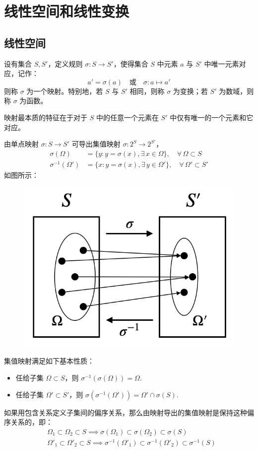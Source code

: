 \section{线性空间和线性变换}

\subsection{线性空间}

\begin{definition}[映射，变换，函数]
设有集合 $S,S'$，定义规则 $\sigma:S\to S'$，使得集合 $S$ 中元素 $a$ 与 $S'$ 中唯一元素对应，记作：
\[
a'=\sigma(a)\quad\text{或}\quad \sigma:a\mapsto a'
\]
则称 $\sigma$ 为一个映射。特别地，若 $S$ 与 $S'$ 相同，则称 $\sigma$ 为变换；若 $S'$ 为数域，则称 $\sigma$ 为函数。
\end{definition}
\begin{com}
映射最本质的特征在于对于 $S$ 中的任意一个元素在 $S'$ 中仅有唯一的一个元素和它对应。
\end{com}

\begin{definition}[集值映射]
由单点映射 $\sigma:S\to S'$ 可导出集值映射 $\sigma:2^S\to 2^{S'}$，
\begin{align*}
    \sigma(\Omega)&=\{y:y=\sigma(x),\exists\,x\in\Omega\},\quad\forall\,\Omega\subset S\\
    \sigma^{-1}(\Omega')&=\{x:y=\sigma(x),\exists\,y\in\Omega'\},\quad\forall\,\Omega'\subset S'
\end{align*}
如图所示：
\begin{figure}[H]
    \centering
    \includegraphics[width=0.25\linewidth]{figs/set-proj.png}
\end{figure}

\end{definition}

\begin{property}[集值映射的基本性质]
集值映射满足如下基本性质：
\begin{itemize}
    \item 任给子集 $\Omega\subset S$，则 $\sigma^{-1}(\sigma(\Omega))=\Omega$.
    \item 任给子集 $\Omega'\subset S'$，则 $\sigma(\sigma^{-1}(\Omega'))=\Omega'\cap \sigma(S)$.
\end{itemize}
如果用包含关系定义子集间的偏序关系，那么由映射导出的集值映射是保持这种偏序关系的，即：
\begin{align*}
&\Omega_1\subset\Omega_2\subset S\implies \sigma(\Omega_1)\subset \sigma(\Omega_2)\subset \sigma(S)\\
&\Omega'_1\subset\Omega'_2\subset S\implies \sigma^{-1}(\Omega'_1)\subset \sigma^{-1}(\Omega'_2)\subset \sigma^{-1}(S)
\end{align*}
\end{property}

